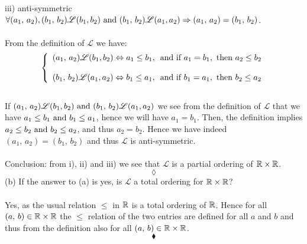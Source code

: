 iii) anti-symmetric  $\forall (a_1,\, a_2), (b_1,\, b_2)\mathscr{L} (b_1, b_2)\text{ and } (b_1,\, b_2)\mathscr{L} (a_1, a_2) \Rightarrow (a_1,\, a_2)= (b_1,\, b_2)$.\\\\
From the definition of $\mathscr{L}$ we have:
 \begin{align}\left\{\begin{array}{l}(a_1,\, a_2)\mathscr{L} (b_1, b_2)\Leftrightarrow a_1\leq b_1,\,\text{ and if } a_1 = b_1, \text{ then } a_2\leq b_2\\\\
 (b_1,\, b_2)\mathscr{L} (a_1, a_2)\Leftrightarrow b_1\leq a_1,\,\text{ and if } b_1 = a_1, \text{ then } b_2\leq a_2
 \end{array}\right.
 \end{align}\\
If $(a_1,\, a_2)\mathscr{L} (b_1, b_2)\text{ and } (b_1,\, b_2)\mathscr{L} (a_1, a_2)$ we see from the definition of $\mathscr{L}$ that we have $a_1\leq b_1 \text{ and } b_1\leq a_1$, hence we will have $a_1=b_1$. Then, the definition implies  $a_2\leq b_2 \text{ and } b_2\leq a_2$, and thus  $a_2=b_2$. Hence we have indeed $(a_1,\, a_2)= (b_1,\, b_2)$ and thus $\mathscr{L}$ is anti-symmetric.\\\\
Conclusion: from i), ii) and iii) we see that $\mathscr{L}$ is a partial ordering  of $\mathbb{R}\times\mathbb{R}$.
$$\lozenge$$
(b) If the answer to (a) is yes, is $\mathscr{L}$  a total ordering for $\mathbb{R}\times\mathbb{R}$? \\\\
Yes, as the usual relation $\leq$ in $\mathbb{R}$ is a total ordering of $\mathbb{R}$. Hence for all $(a,\,b)\in \mathbb{R}\times \mathbb{R}$ the $\leq$ relation of the two entries are defined for all $a$ and $b$ and thus from the definition also for all $(a,\,b)\in \mathbb{R}\times \mathbb{R}$.
 $$\blacklozenge$$


